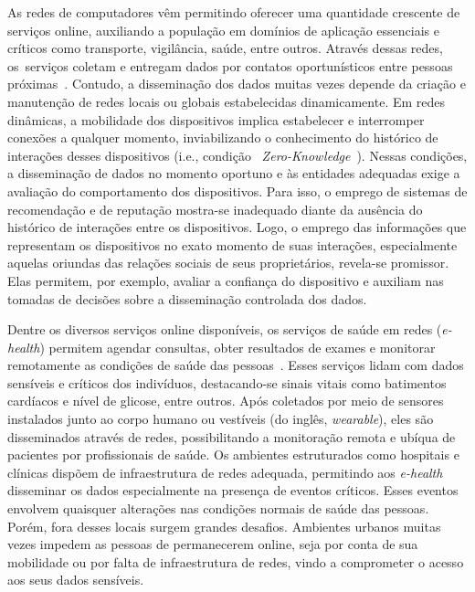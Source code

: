 \documentclass[12pt]{article}
\begin{document}
As redes de computadores vêm permitindo oferecer uma quantidade crescente de serviços online, auxiliando a população em domínios de aplicação essenciais e críticos como transporte, vigilância, saúde, entre outros. Através dessas redes, os~serviços coletam e entregam dados por contatos oportunísticos entre pessoas próximas~\cite{garyfalos2008coupons}. 
Contudo, a disseminação %
dos  
dados muitas vezes depende da criação e manutenção de redes locais ou globais estabelecidas dinamicamente. Em redes dinâmicas, a mobilidade dos dispositivos implica estabelecer e interromper conexões a qualquer momento, inviabilizando o conhecimento do histórico de interações desses dispositivos (i.e., condição ~\textit{Zero-Knowledge}~\cite{feige1988zero,kim2015hcs}). Nessas condições, 
a disseminação de dados no momento oportuno e às entidades adequadas exige a avaliação do comportamento dos dispositivos. 
Para isso, o emprego de sistemas de recomendação e de reputação mostra-se inadequado diante da ausência do histórico de interações entre os dispositivos. Logo, o emprego das informações que representam os dispositivos no exato momento de suas interações, especialmente aquelas oriundas das relações sociais de seus proprietários, revela-se promissor. Elas permitem, por exemplo, avaliar a confiança do dispositivo e auxiliam nas tomadas de decisões sobre a disseminação controlada dos dados.


Dentre os diversos serviços online disponíveis, os serviços de saúde em redes (\textit{e-health}) permitem agendar consultas, obter resultados de exames e monitorar remotamente as condições de saúde das pessoas~\cite{gharaibeh2017smart}. Esses serviços lidam com dados sensíveis e críticos dos indivíduos, destacando-se sinais vitais como batimentos cardíacos e nível de glicose, entre outros. Após coletados por meio de sensores instalados junto ao corpo humano ou vestíveis (do inglês, \textit{wearable}), eles são disseminados através de redes, possibilitando a monitoração remota e ubíqua de pacientes por profissionais de saúde. Os ambientes estruturados como hospitais e clínicas dispõem de infraestrutura de redes adequada, permitindo aos \textit{e-health} disseminar os dados especialmente na presença de eventos críticos. Esses eventos envolvem quaisquer alterações nas condições normais de saúde das pessoas. Porém, fora desses locais surgem grandes desafios. Ambientes urbanos muitas vezes impedem as pessoas de permanecerem online, seja por conta de sua mobilidade ou por falta de infraestrutura de redes, vindo a comprometer o acesso aos seus dados sensíveis.
\end{document}
